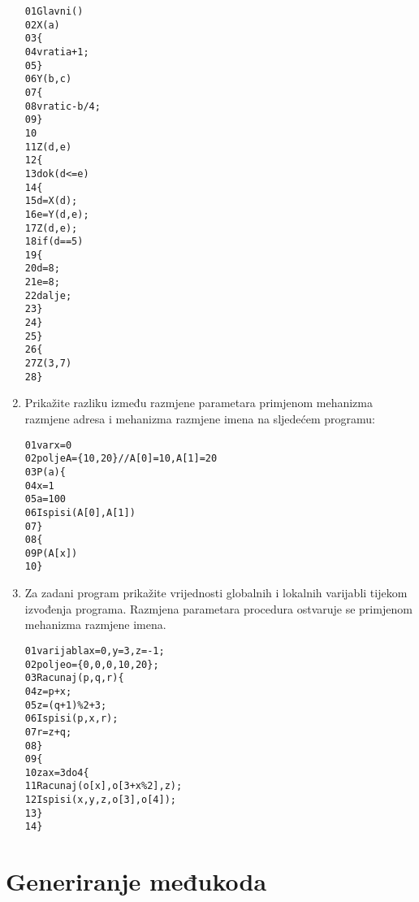 \documentclass[times, 12pt, utf8]{book}
\begin{document}
\begin{enumerate}[resume]
\begin{alltt}
01  Glavni()
02    X(a)
03    \verb|{|
04      vrati a + 1;
05    \verb|}|
06    Y(b, c)
07    \verb|{|
08      vrati c - b/4;
09    \verb|}|
10
11    Z(d, e)
12    \verb|{|
13      dok (d <= e)
14      \verb|{|
15        d = X(d);
16        e = Y(d, e);
17        Z(d, e);
18        if (d == 5)
19        \verb|{|
20          d = 8;
21          e = 8;
22          dalje;
23        \verb|}|
24      \verb|}|
25    \verb|}|
26  \verb|{|
27    Z(3, 7)
28  \verb|}|
\end{alltt}

\item
Prikažite razliku između razmjene parametara primjenom mehanizma razmjene adresa i mehanizma razmjene imena na sljedećem programu: \cite[str.~243-252]{udzbenik} \cite{auditorne}

\begin{alltt}
01  var x = 0
02  polje A = \verb|{|10, 20\verb|}| // A[0]=10, A[1]=20
03  P(a) \verb|{|
04    x = 1
05    a = 100
06    Ispisi(A[0], A[1])
07  \verb|}|
08  \verb|{|
09    P(A[x])
10  \verb|}|
\end{alltt}

\item
Za zadani program prikažite vrijednosti globalnih i lokalnih varijabli tijekom izvođenja programa. Razmjena parametara procedura ostvaruje se primjenom mehanizma razmjene imena. \cite[str.~243-252]{udzbenik} \cite{auditorne}

\begin{alltt}
01  varijabla x=0, y=3, z=-1;
02  polje o = \verb|{|0, 0, 0, 10, 20\verb|}|;
03  Racunaj(p, q, r) \verb|{|
04    z = p + x;
05    z = (q + 1) \% 2 + 3;
06    Ispisi(p, x, r);
07    r = z + q;
08  \verb|}|
09  \verb|{|
10    za x = 3 do 4 \verb|{|
11      Racunaj(o[x], o[3+x\%2], z);
12      Ispisi(x, y, z, o[3], o[4]);
13    \verb|}|
14  \verb|}|
\end{alltt}

\end{enumerate}


\chapter{Generiranje međukoda}

\end{document}
